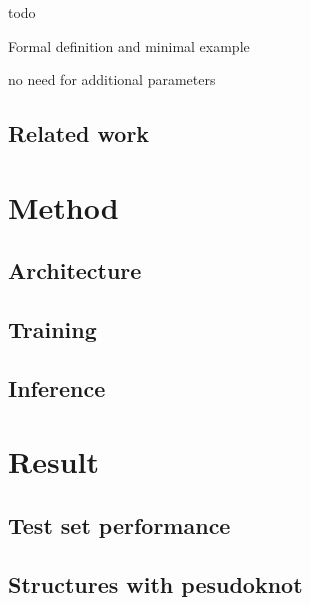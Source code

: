 \documentclass{article}
\begin{document}
todo


Formal definition and minimal example




no need for additional parameters







\subsection{Related work}



\section{Method}



\subsection{Architecture}


\subsection{Training}



\subsection{Inference} \label{sec:inference}



\section{Result}

\subsection{Test set performance}


\subsection{Structures with pesudoknot}





%
%
%
\end{document}
